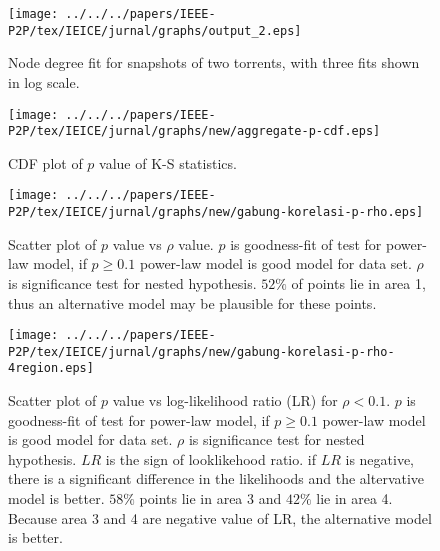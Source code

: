 \begin{figure}[!tb]
\begin{center}
\texttt{[image: ../../../papers/IEEE-P2P/tex/IEICE/jurnal/graphs/output\_2.eps]}
\end{center}
\caption{Node degree fit for snapshots of two torrents, with three fits shown in log scale.} 
\label{fig:fitting}
\end{figure}

\begin{figure}[!tb]
\begin{center}
\texttt{[image: ../../../papers/IEEE-P2P/tex/IEICE/jurnal/graphs/new/aggregate-p-cdf.eps]}
\end{center}
\caption{CDF plot of $p$ value of K-S statistics.} 
\label{fig:cdf-p}
\end{figure}



\begin{figure}[!tb]
\begin{center}
\texttt{[image: ../../../papers/IEEE-P2P/tex/IEICE/jurnal/graphs/new/gabung-korelasi-p-rho.eps]}
\end{center}
\caption{Scatter plot of $p$ value vs $\rho$ value. 
$p$ is goodness-fit of test for power-law model, if $p \geq 0.1$ power-law model is good model for data set. 
$\rho$ is significance test for nested hypothesis. $52\%$ of points lie in area 1, thus an alternative model may be plausible for these points. } 
\label{fig:scatter-pvalue-vs-rho}
\end{figure}

\begin{figure}[!tb]
\begin{center}
\texttt{[image: ../../../papers/IEEE-P2P/tex/IEICE/jurnal/graphs/new/gabung-korelasi-p-rho-4region.eps]}
\end{center}
\caption{Scatter plot of $p$ value vs log-likelihood ratio (LR) for $\rho < 0.1$. 
$p$ is goodness-fit of test for power-law model, if $p \geq 0.1$ power-law model is good model for data set. $\rho$ is significance test for nested hypothesis.
$LR$ is the sign of looklikehood ratio.  
if $LR$ is negative, there is a significant difference in the likelihoods and the altervative model is better.
$58\%$ points lie in area 3 and $42\%$ lie in area 4. 
Because area 3 and 4 are negative value of LR, the alternative model is better.
} 
\label{fig:scatter-pvalue-vs-lr-for-rho-le-01}
\end{figure}


